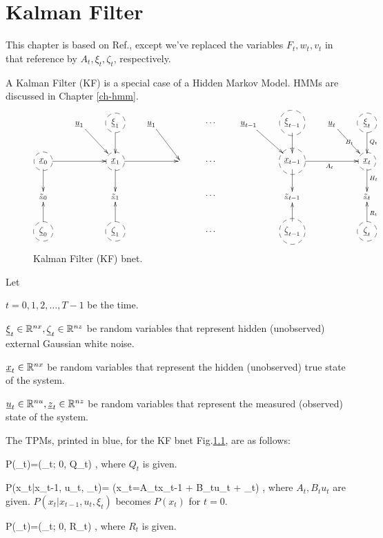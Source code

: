 \chapter{Kalman Filter}\label{ch-kalman}

This
chapter is based on Ref.\cite{wiki-kalman},
except we've replaced the
variables $F_t, w_t, v_t$ in that reference by 
$A_t, \xi_t,\zeta_t$, respectively.

A Kalman Filter (KF) is a special case of a
Hidden Markov Model. HMMs are
 discussed in Chapter \ref{ch-hmm}.

\begin{figure}[h!]
$$\xymatrix{
&\rvu_1\ar[dr]
&*++[F-o]{\rvxi_1}\ar[d]
&\rvu_1\ar[dr]
&&\cdots
&\rvu_{t-1}\ar[dr]
&*++[F-o]{\rvxi_{t-1}}\ar[d]
&\rvu_t\ar[dr]|{B_t}
&*++[F-o]{\rvxi_{t}}\ar[d]^{Q_t}
\\
*++[F-o]{\rvx_0}\ar[d]\ar[rr]
&&*++[F-o]{\rvx_1}\ar[d]\ar[rr]
&&&\cdots
&&*++[F-o]{\rvx_{t-1}}\ar[d]\ar[rr]_{A_t}
&&*++[F-o]{\rvx_{t}}\ar[d]^{H_t}
\\
\rvz_0
&&\rvz_1
&&&\cdots
&&\rvz_{t-1}
&
&\rvz_{t}
\\
*++[F-o]{\rvzeta_0}\ar[u]
&&*++[F-o]{\rvzeta_1}\ar[u]
&&&\cdots
&&*++[F-o]{\rvzeta_{t-1}}\ar[u]
&&*++[F-o]{\rvzeta_{t}}\ar[u]_{R_t}
}$$
\caption{Kalman Filter (KF) bnet.}
\label{fig-kal}
\end{figure}

Let 

$t=0, 1, 2, \dots , T-1$ be the time.

$\rvxi_t\in\RR^{nx},
 \rvzeta_t\in \RR^{nz}$ be
random variables that represent
hidden (unobserved)   external
Gaussian white noise.

$\rvx_t\in \RR^{nx}$ be
random variables that represent
the hidden (unobserved) true
state of the system.

$\rvu_t\in \RR^{nu}, 
\rvz_t\in \RR^{nz}$ be
random variables that represent
the measured (observed) 
state of the system.


The TPMs, printed in blue,
for the KF bnet Fig.\ref{fig-kal},
are as follows:

\beq\color{blue}
P(\xi_t)=\caln(\xi_t; 0, Q_t)
\;,
\eeq
where $Q_t$ is given.


\beq\color{blue}
P(x_t|x_{t-1}, u_t, \xi_t)=
\indi(x_t=A_tx_{t-1} + B_tu_t + \xi_t)
\;,
\eeq
where $A_t, B_tu_t$
are given. $P(x_t|x_{t-1}, u_t, \xi_t)$
 becomes $P(x_t)$
for $t=0$.

\beq\color{blue}
P(\zeta_t)=\caln(\zeta_t; 0, R_t)
\;,
\eeq
where $R_t$ is given.

